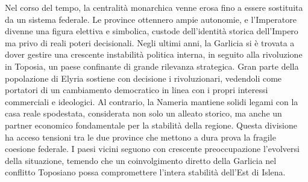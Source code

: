 \documentclass[10pt, a4paper]{report}
\begin{document}
\begin{multicols}{2}
Nel corso del tempo, la centralità monarchica venne erosa fino a essere sostituita da un sistema federale. Le province ottennero ampie autonomie, e l’Imperatore divenne una figura elettiva e simbolica, custode dell’identità storica dell’Impero ma privo di reali poteri decisionali.
Negli ultimi anni, la Garlicia si è trovata a dover gestire una crescente instabilità politica interna, in seguito alla rivoluzione in Toposia, un paese confinante di grande rilevanza strategica. Gran parte della popolazione di Elyria sostiene con decisione i rivoluzionari, vedendoli come portatori di un cambiamento democratico in linea con i propri interessi commerciali e ideologici. Al contrario, la Nameria mantiene solidi legami con la casa reale spodestata, considerata non solo un alleato storico, ma anche un partner economico fondamentale per la stabilità della regione. Questa divisione ha acceso tensioni tra le due province che mettono a dura prova la fragile coesione federale.
I paesi vicini seguono con crescente preoccupazione l’evolversi della situazione, temendo che un coinvolgimento diretto della Garlicia nel conflitto Toposiano possa compromettere l'intera stabilità dell'Est di Islena.


\end{multicols}
\end{document}
